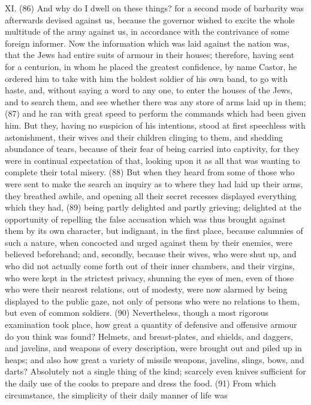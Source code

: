 XI. (86) And why do I dwell on these things? for a second mode of barbarity was afterwards
devised against us, because the governor wished to excite the whole multitude of the army against
us, in accordance with the contrivance of some foreign informer. Now the information which was
laid against the nation was, that the Jews had entire suits of armour in their houses; therefore,
having sent for a centurion, in whom he placed the greatest confidence, by name Castor, he
ordered him to take with him the boldest soldier of his own band, to go with haste, and, without
saying a word to any one, to enter the houses of the Jews, and to search them, and see whether
there was any store of arms laid up in them; (87) and he ran with great speed to perform the
commands which had been given him. But they, having no suspicion of his intentions, stood at first
speechless with astonishment, their wives and their children clinging to them, and shedding
abundance of tears, because of their fear of being carried into captivity, for they were in continual
expectation of that, looking upon it as all that was wanting to complete their total misery. (88) But
when they heard from some of those who were sent to make the search an inquiry as to where
they had laid up their arms, they breathed awhile, and opening all their secret recesses displayed
everything which they had, (89) being partly delighted and partly grieving; delighted at the
opportunity of repelling the false accusation which was thus brought against them by its own
character, but indignant, in the first place, because calumnies of such a nature, when concocted
and urged against them by their enemies, were believed beforehand; and, secondly, because their
wives, who were shut up, and who did not actually come forth out of their inner chambers, and their
virgins, who were kept in the strictest privacy, shunning the eyes of men, even of those who were
their nearest relations, out of modesty, were now alarmed by being displayed to the public gaze,
not only of persons who were no relations to them, but even of common soldiers. (90)
Nevertheless, though a most rigorous examination took place, how great a quantity of defensive
and offensive armour do you think was found? Helmets, and breast-plates, and shields, and
daggers, and javelins, and weapons of every description, were brought out and piled up in heaps;
and also how great a variety of missile weapons, javelins, slings, bows, and darts? Absolutely not a
single thing of the kind; scarcely even knives sufficient for the daily use of the cooks to prepare
and dress the food. (91) From which circumstance, the simplicity of their daily manner of life was
